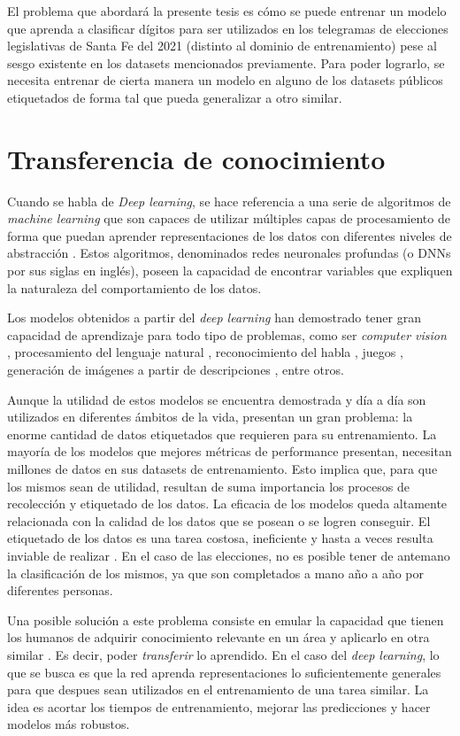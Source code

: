 El problema que abordar\'a la presente tesis es c\'omo se puede entrenar un modelo que aprenda a clasificar d\'igitos
para ser utilizados en los telegramas de elecciones legislativas de Santa Fe del 2021 (distinto al dominio de
entrenamiento) pese al sesgo existente en los datasets mencionados previamente. Para poder lograrlo, se necesita
entrenar de cierta manera un modelo en alguno de los datasets p\'ublicos etiquetados de forma tal que pueda generalizar
a otro similar.

\section{Transferencia de conocimiento}

Cuando se habla de {\it Deep learning}, se hace referencia a una serie de algoritmos de {\it machine learning} que son
capaces de utilizar m\'ultiples capas de procesamiento de forma que puedan aprender representaciones de los datos con
diferentes niveles de abstracci\'on \parencite{lecun2015deep}. Estos algoritmos, denominados redes neuronales profundas (o DNNs por sus siglas en ingl\'es),
poseen la capacidad de encontrar variables que expliquen la naturaleza del comportamiento de los datos.

Los modelos obtenidos a partir del {\it deep learning} han demostrado tener gran capacidad de aprendizaje para todo
tipo de problemas, como ser {\it computer vision} \parencite{szeliski2010computer, redmon2016yolo}, procesamiento del lenguaje natural \parencite{devlin2018bert}, reconocimiento del habla \parencite{hannun2014deep}, juegos \parencite{silver2016mastering}, generaci\'on de im\'agenes a partir de descripciones \parencite{ramesh2022dalle2}, entre otros.

Aunque la utilidad de estos modelos se encuentra demostrada y d\'ia a d\'ia son utilizados en diferentes \'ambitos de
la vida, presentan un gran problema: la enorme cantidad de datos etiquetados que requieren para su entrenamiento. La
mayor\'ia de los modelos que mejores m\'etricas de performance presentan, necesitan millones de datos en sus datasets
de entrenamiento. Esto implica que, para que los mismos sean de utilidad, resultan de suma importancia los procesos de
recolecci\'on y etiquetado de los datos. La eficacia de los modelos queda altamente relacionada con la calidad de los
datos que se posean o se logren conseguir. El etiquetado de los datos es una tarea costosa, ineficiente y hasta a veces
resulta inviable de realizar \parencite{reis2022data}. En el caso de las elecciones, no es posible tener de antemano la clasificaci\'on de los mismos,
ya que son completados a mano a\~{n}o a a\~{n}o por diferentes personas.

Una posible soluci\'on a este problema consiste en emular la capacidad que tienen los humanos de adquirir conocimiento
relevante en un \'area y aplicarlo en otra similar \parencite{thrun1998learning}. Es decir, poder {\it transferir} lo aprendido. En el caso del {\it deep learning}, lo que se
busca es que la red aprenda representaciones lo suficientemente generales para que despues sean utilizados en el
entrenamiento de una tarea similar. La idea es acortar los tiempos de entrenamiento, mejorar las predicciones y hacer
modelos m\'as robustos.
